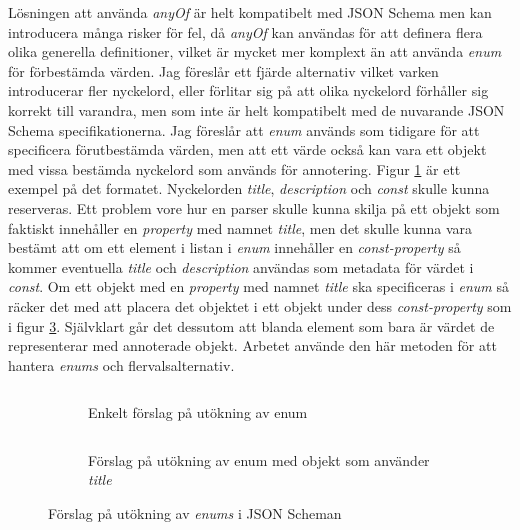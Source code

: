 Lösningen att använda \textit{anyOf} är helt kompatibelt med JSON Schema men kan introducera många risker för fel, då \textit{anyOf} kan användas för att definera flera olika generella definitioner, vilket är mycket mer komplext än att använda \textit{enum} för förbestämda värden. Jag föreslår ett fjärde alternativ vilket varken introducerar fler nyckelord, eller förlitar sig på att olika nyckelord förhåller sig korrekt till varandra, men som inte är helt kompatibelt med de nuvarande JSON Schema specifikationerna. Jag föreslår att \textit{enum} används som tidigare för att specificera förutbestämda värden, men att ett värde också kan vara ett objekt med vissa bestämda nyckelord som används för annotering. Figur \ref{fig:enum-example:const} är ett exempel på det formatet. Nyckelorden \textit{title}, \textit{description} och \textit{const} skulle kunna reserveras. Ett problem vore hur en parser skulle kunna skilja på ett objekt som faktiskt innehåller en \textit{property} med namnet \textit{title}, men det skulle kunna vara bestämt att om ett element i listan i \textit{enum} innehåller en \textit{const-property} så kommer eventuella \textit{title} och \textit{description} användas som metadata för värdet i \textit{const}. Om ett objekt med en \textit{property} med namnet \textit{title} ska specificeras i \textit{enum} så räcker det med att placera det objektet i ett objekt under dess \textit{const-property} som i figur \ref{fig:enum-example:title}. Självklart går det dessutom att blanda element som bara är värdet de representerar med annoterade objekt. Arbetet använde den här metoden för att hantera \textit{enums} och flervalsalternativ.

\begin{figure}
	\begin{subfigure}[t]{0.47\textwidth}
		\inputminted[tabsize=2, frame=single, fontsize=\small, framesep=2mm, breaklines]{json}{code/enum-example/const.json}
		\vspace{-1.2em}
		\caption{Enkelt förslag på utökning av enum}
		\label{fig:enum-example:const}
	\end{subfigure}\hfill
	\begin{subfigure}[t]{0.47\textwidth}
		\inputminted[tabsize=2, frame=single, fontsize=\small, framesep=2mm, breaklines]{json}{code/enum-example/nested.json}
		\vspace{-1.2em}
		\caption{Förslag på utökning av enum med objekt som använder \textit{title}}
		\label{fig:enum-example:title}
	\end{subfigure}
	\caption{Förslag på utökning av \textit{enums} i JSON Scheman}
\end{figure}